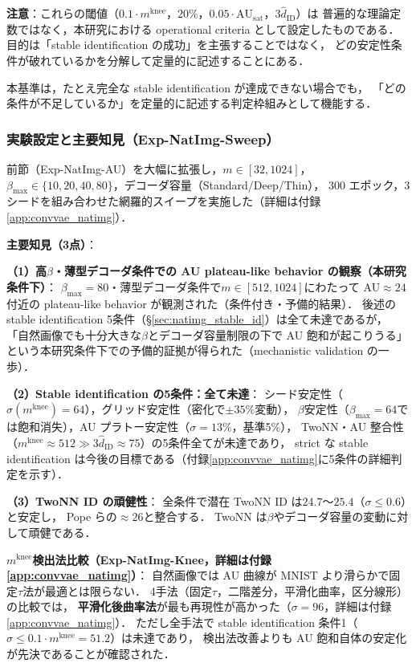 \documentclass[11pt,a4paper]{jsarticle}
\newcommand{\AUsat}{\mathrm{AU}_{\mathrm{sat}}}
\newcommand{\mknee}{m^{\mathrm{knee}}}
\begin{document}
\textbf{注意}：これらの閾値（$0.1\cdot\mknee$，$20\%$，$0.05\cdot\AUsat$，$3\hat{d}_\mathrm{ID}$）は
普遍的な理論定数ではなく，本研究における operational criteria として設定したものである．
目的は「stable identification の成功」を主張することではなく，
どの安定性条件が破れているかを分解して定量的に記述することにある．

本基準は，たとえ完全な stable identification が達成できない場合でも，
「どの条件が不足しているか」を定量的に記述する判定枠組みとして機能する．

\subsubsection*{実験設定と主要知見（Exp-NatImg-Sweep）}

前節（Exp-NatImg-AU）を大幅に拡張し，$m \in [32, 1024]$，
$\beta_{\max} \in \{10,20,40,80\}$，デコーダ容量（Standard/Deep/Thin），
300 エポック，3シードを組み合わせた網羅的スイープを実施した（詳細は付録\ref{app:convvae_natimg}）．

\textbf{主要知見（3点）}：

\textbf{（1）高$\beta$・薄型デコーダ条件での AU plateau-like behavior の観察（本研究条件下）}：
$\beta_{\max}=80$・薄型デコーダ条件で$m \in [512, 1024]$にわたって AU$\approx 24$付近の
plateau-like behavior が観測された（条件付き・予備的結果）．
後述の stable identification 5条件（§\ref{sec:natimg_stable_id}）は全て未達であるが，
「自然画像でも十分大きな$\beta$とデコーダ容量制限の下で AU 飽和が起こりうる」
という本研究条件下での予備的証拠が得られた（mechanistic validation の一歩）．

\textbf{（2）Stable identification の5条件：全て未達}：
シード安定性（$\sigma(\mknee)=64$），グリッド安定性（密化で$\pm35\%$変動），
$\beta$安定性（$\beta_{\max}=64$では飽和消失），AU プラトー安定性（$\sigma=13\%$，基準5\%），
TwoNN・AU 整合性（$\mknee \approx 512 \gg 3\hat{d}_\mathrm{ID} \approx 75$）の5条件全てが未達であり，
strict な stable identification は今後の目標である（付録\ref{app:convvae_natimg}に5条件の詳細判定を示す）．

\textbf{（3）TwoNN ID の頑健性}：
全条件で潜在 TwoNN ID は$24.7$〜$25.4$（$\sigma \leq 0.6$）と安定し，
Pope ら\cite{pope2021intrinsic}の$\approx 26$と整合する．
TwoNN は$\beta$やデコーダ容量の変動に対して頑健である．

\textbf{$\mknee$検出法比較（Exp-NatImg-Knee，詳細は付録\ref{app:convvae_natimg}）}：
自然画像では AU 曲線が MNIST より滑らかで固定$\tau$法が最適とは限らない．
4手法（固定$\tau$，二階差分，平滑化曲率，区分線形）の比較では，
\textbf{平滑化後曲率法}が最も再現性が高かった（$\sigma=96$，詳細は付録\ref{app:convvae_natimg}）．
ただし全手法で stable identification 条件1（$\sigma \leq 0.1\cdot\mknee = 51.2$）は未達であり，
検出法改善よりも AU 飽和自体の安定化が先決であることが確認された．
\end{document}
